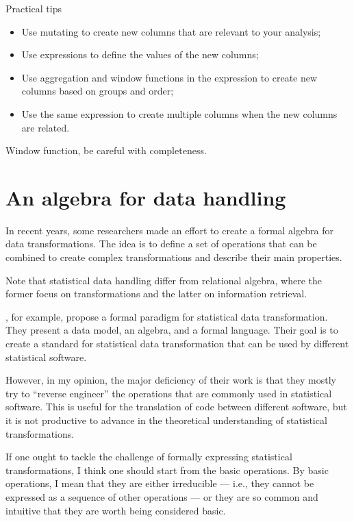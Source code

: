 \begin{hlbox}{Practical tips}
  \begin{itemize}
    \item Use mutating to create new columns that are relevant to your analysis;
    \item Use expressions to define the values of the new columns;
    \item Use aggregation and window functions in the expression to create new columns based on
      groups and order;
    \item Use the same expression to create multiple columns when the new columns are related.
  \end{itemize}
\end{hlbox}

Window function, be careful with completeness.

\section{An algebra for data handling}

In recent years, some researchers made an effort to create a formal algebra for data
transformations.  The idea is to define a set of operations that can be combined to create
complex transformations and describe their main properties.

Note that statistical data handling differ from relational algebra, where the former focus
on transformations and the latter on information retrieval.

\citeauthor{Song2021}, for example, propose a formal paradigm for statistical data
transformation.  They present a data model, an algebra, and a formal language.  Their goal
is to create a standard for statistical data transformation that can be used by different
statistical software.

However, in my opinion, the major deficiency of their work is that they mostly try to
``reverse engineer'' the operations that are commonly used in statistical software.  This
is useful for the translation of code between different software, but it is not productive
to advance in the theoretical understanding of statistical transformations.

If one ought to tackle the challenge of formally expressing statistical transformations, I
think one should start from the basic operations.  By basic operations, I mean that they
are either irreducible --- i.e., they cannot be expressed as a sequence of other
operations --- or they are so common and intuitive that they are worth being considered
basic.

